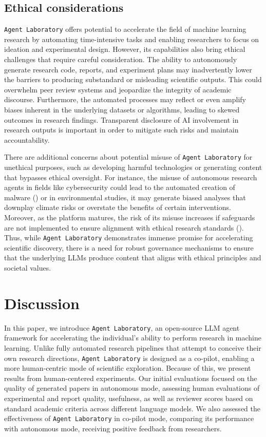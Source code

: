 \documentclass[11pt, a4paper]{gdm_format}
\begin{document}
\subsection{Ethical considerations}

\texttt{Agent Laboratory} offers potential to accelerate the field of machine learning research by automating time-intensive tasks and enabling researchers to focus on ideation and experimental design. However, its capabilities also bring ethical challenges that require careful consideration. The ability to autonomously generate research code, reports, and experiment plans may inadvertently lower the barriers to producing substandard or misleading scientific outputs. This could overwhelm peer review systems and jeopardize the integrity of academic discourse. Furthermore, the automated processes may reflect or even amplify biases inherent in the underlying datasets or algorithms, leading to skewed outcomes in research findings. Transparent disclosure of AI involvement in research outputs is important in order to mitigate such risks and maintain accountability.

There are additional concerns about potential misuse of \texttt{Agent Laboratory} for unethical purposes, such as developing harmful technologies or generating content that bypasses ethical oversight. For instance, the misuse of autonomous research agents in fields like cybersecurity could lead to the automated creation of malware (\cite{xu2024autoattacker, happe2023getting, francia2024assessing, begou2023exploring}) or in environmental studies, it may generate biased analyses that downplay climate risks or overstate the benefits of certain interventions. Moreover, as the platform matures, the risk of its misuse increases if safeguards are not implemented to ensure alignment with ethical research standards (\cite{watkins2024guidance, jiao2024navigating}). Thus, while \texttt{Agent Laboratory} demonstrates immense promise for accelerating scientific discovery, there is a need for robust governance mechanisms to ensure that the underlying LLMs produce content that aligns with ethical principles and societal values.

\section{Discussion}


In this paper, we introduce \texttt{Agent Laboratory}, an open-source LLM agent framework for accelerating the individual’s ability to perform research in machine learning. Unlike fully automated research pipelines that attempt to conceive their own research directions, \texttt{Agent Laboratory} is designed as a co-pilot, enabling a more human-centric mode of scientific exploration. Because of this, we present results from human-centered experiments. Our initial evaluations focused on the quality of generated papers in autonomous mode, assessing human evaluations of experimental and report quality, usefulness, as well as reviewer scores based on standard academic criteria across different language models. We also assessed the effectiveness of \texttt{Agent Laboratory} in co-pilot mode, comparing its performance with autonomous mode, receiving positive feedback from researchers. 
\end{document}

